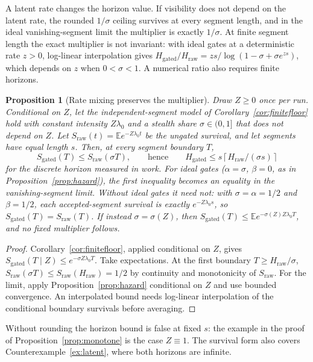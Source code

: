 \documentclass[11pt]{article}
\newtheorem{proposition}[theorem]{Proposition}
\theoremstyle{definition}
\theoremstyle{remark}
\newcommand{\E}{\mathbb E}
\begin{document}
A latent rate changes the horizon value. If visibility does not depend on the latent rate, the
rounded $1/\sigma$ ceiling survives at every segment length, and in the ideal vanishing-segment
limit the multiplier is exactly $1/\sigma$. At finite segment length the exact multiplier is not
invariant: with ideal gates at a deterministic rate $z>0$, log-linear interpolation gives
$H_{\mathrm{gated}}/H_{\mathrm{raw}}=zs/\log(1-\sigma+\sigma e^{zs})$, which depends on $z$ when
$0<\sigma<1$. A numerical ratio also requires finite horizons.

\begin{proposition}[Rate mixing preserves the multiplier]\label{prop:mixing}
Draw $Z\ge0$ once per run. Conditional on $Z$, let the independent-segment model of
Corollary~\ref{cor:finitefloor} hold with constant intensity $Z\lambda_0$ and a stealth share
$\sigma\in(0,1]$ that does not depend on $Z$. Let $S_{\mathrm{raw}}(t)=\E e^{-Z\lambda_0t}$
be the ungated survival, and let segments have equal length $s$. Then, at every segment
boundary $T$,
\[
S_{\mathrm{gated}}(T)\le S_{\mathrm{raw}}(\sigma T),
\qquad\text{hence}\qquad
H_{\mathrm{gated}}\le s\left\lceil H_{\mathrm{raw}}/(\sigma s)\right\rceil
\]
for the discrete horizon measured in work.
For ideal gates ($\alpha=\sigma$, $\beta=0$, as in Proposition~\ref{prop:hazard}), the first
inequality becomes an equality in the vanishing-segment limit. Without ideal gates it need not:
with $\sigma=\alpha=1/2$ and $\beta=1/2$, each accepted-segment survival is exactly
$e^{-Z\lambda_0s}$, so $S_{\mathrm{gated}}(T)=S_{\mathrm{raw}}(T)$. If instead $\sigma=\sigma(Z)$, then
$S_{\mathrm{gated}}(T)\le\E e^{-\sigma(Z)Z\lambda_0T}$, and no fixed multiplier follows.
\end{proposition}
\begin{proof}
Corollary~\ref{cor:finitefloor}, applied conditional on $Z$, gives
$S_{\mathrm{gated}}(T\mid Z)\le e^{-\sigma Z\lambda_0T}$. Take expectations. At the first
boundary $T\ge H_{\mathrm{raw}}/\sigma$, $S_{\mathrm{raw}}(\sigma T)\le S_{\mathrm{raw}}(H_{\mathrm{raw}})=1/2$
by continuity and monotonicity of $S_{\mathrm{raw}}$. For the limit, apply
Proposition~\ref{prop:hazard} conditional on $Z$ and use bounded convergence. An interpolated
bound needs log-linear interpolation of the conditional boundary survivals before averaging.
\end{proof}
Without rounding the horizon bound is false at fixed $s$: the example in the proof of
Proposition~\ref{prop:monotone} is the case $Z\equiv1$.
The survival form also covers Counterexample~\ref{ex:latent}, where both horizons are infinite.
\end{document}
